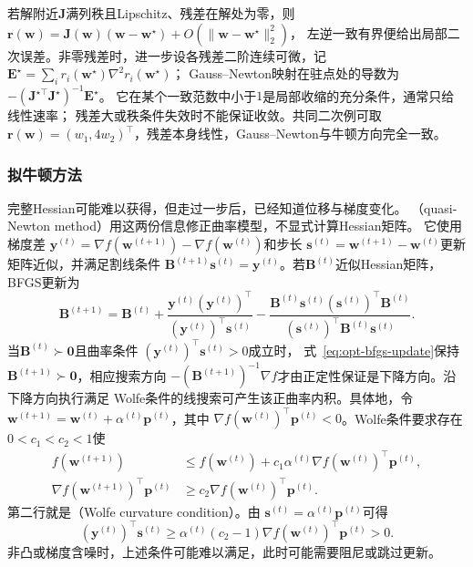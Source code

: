 若解附近$\bm J$满列秩且Lipschitz、残差在解处为零，则
$\bm r(\bm w)=\bm J(\bm w)(\bm w-\bm w^\star)+O(\|\bm w-\bm w^\star\|_2^2)$，
左逆一致有界便给出局部二次误差。非零残差时，进一步设各残差二阶连续可微，记
$\bm E^\star=\sum_i r_i(\bm w^\star)\nabla^2r_i(\bm w^\star)$；
Gauss--Newton映射在驻点处的导数为
$-(\bm J^{\star\top}\bm J^\star)^{-1}\bm E^\star$。
它在某个一致范数中小于$1$是局部收缩的充分条件，通常只给线性速率；
残差大或秩条件失效时不能保证收敛。共同二次例可取
$\bm r(\bm w)=(w_1,4w_2)^\top$，残差本身线性，Gauss--Newton与牛顿方向完全一致。

\subsubsection{拟牛顿方法}
\label{sec:opt-quasi-newton}

完整Hessian可能难以获得，但走过一步后，已经知道位移与梯度变化。
（quasi-Newton method）用这两份信息修正曲率模型，不显式计算Hessian矩阵。
它使用梯度差
$\bm{y}^{(t)}=\nabla f(\bm{w}^{(t+1)})-\nabla f(\bm{w}^{(t)})$和步长
$\bm{s}^{(t)}=\bm{w}^{(t+1)}-\bm{w}^{(t)}$更新矩阵近似，并满足割线条件
$\bm{B}^{(t+1)}\bm{s}^{(t)}=\bm{y}^{(t)}$。若$\bm{B}^{(t)}$近似Hessian矩阵，
BFGS更新为
\begin{equation}
  \bm{B}^{(t+1)}
  =
  \bm{B}^{(t)}
  +
  \frac{\bm{y}^{(t)}(\bm{y}^{(t)})^{\top}}
       {(\bm{y}^{(t)})^{\top}\bm{s}^{(t)}}
  -
  \frac{\bm{B}^{(t)}\bm{s}^{(t)}(\bm{s}^{(t)})^{\top}\bm{B}^{(t)}}
       {(\bm{s}^{(t)})^{\top}\bm{B}^{(t)}\bm{s}^{(t)}}.
  \label{eq:opt-bfgs-update}
\end{equation}
当$\bm{B}^{(t)}\succ\bm{0}$且曲率条件
$(\bm{y}^{(t)})^{\top}\bm{s}^{(t)}>0$成立时，
式~\eqref{eq:opt-bfgs-update}保持$\bm{B}^{(t+1)}\succ\bm{0}$，相应搜索方向
$-(\bm{B}^{(t+1)})^{-1}\nabla f$才由正定性保证是下降方向。沿下降方向执行满足
Wolfe条件的线搜索可产生该正曲率内积。具体地，令
$\bm{w}^{(t+1)}=\bm{w}^{(t)}+\alpha^{(t)}\bm{p}^{(t)}$，其中
$\nabla f(\bm{w}^{(t)})^{\top}\bm{p}^{(t)}<0$。Wolfe条件要求存在
$0<c_1<c_2<1$使
\begin{equation}
\begin{aligned}
  f(\bm{w}^{(t+1)})
  &\leq
  f(\bm{w}^{(t)})
  +
  c_1\alpha^{(t)}
  \nabla f(\bm{w}^{(t)})^{\top}\bm{p}^{(t)},\\
  \nabla f(\bm{w}^{(t+1)})^{\top}\bm{p}^{(t)}
  &\geq
  c_2\nabla f(\bm{w}^{(t)})^{\top}\bm{p}^{(t)}.
\end{aligned}
\label{eq:opt-wolfe-conditions}
\end{equation}
第二行就是（Wolfe curvature condition）。由
$\bm{s}^{(t)}=\alpha^{(t)}\bm{p}^{(t)}$可得
\[
  (\bm{y}^{(t)})^{\top}\bm{s}^{(t)}
  \geq
  \alpha^{(t)}(c_2-1)
  \nabla f(\bm{w}^{(t)})^{\top}\bm{p}^{(t)}
  >0.
\]
非凸或梯度含噪时，上述条件可能难以满足，此时可能需要阻尼或跳过更新。

